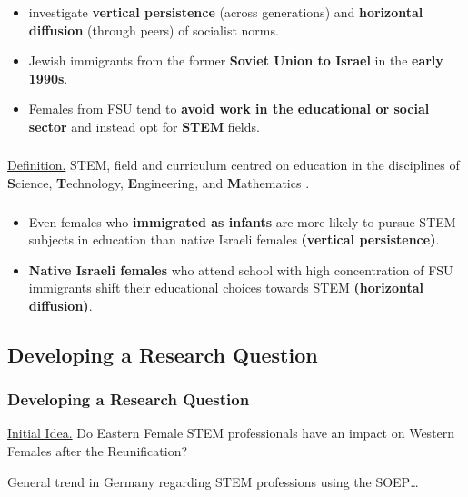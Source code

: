 \documentclass[11pt, aspectratio=1610, xcolor={dvipsnames}]{beamer}
\newcommand{\highlight}[1]{\textbf{\textcolor{PineGreen}{#1}}}
\begin{document}
	\begin{frame}
		\frametitle{}
		
		\begin{itemize}
			\item \cite{FriedmanSokuler2020} investigate \highlight{vertical persistence} (across generations) and \highlight{horizontal diffusion} (through peers) of socialist norms.
			\item Jewish immigrants from the former \highlight{Soviet Union to Israel} in the \highlight{early 1990s}.
			\item Females from FSU tend to \highlight{avoid work in the educational or social sector} and instead opt for \highlight{STEM} fields.
		\end{itemize}
		
	\end{frame}
	
	\begin{frame}
		\frametitle{}
		
		\textcolor{PineGreen}{\underline{Definition.}} STEM, field and curriculum centred on education in the disciplines of \textbf{S}cience, \textbf{T}echnology, \textbf{E}ngineering, and \textbf{M}athematics \textcolor{darkgray}{\citep{Hallinen2024}}.
		
	\end{frame}
	
	\begin{frame}
		\frametitle{}
		
		\begin{itemize}
			\item Even females who \highlight{immigrated as infants} are more likely to pursue STEM subjects in education than native Israeli females \highlight{(vertical persistence)}.
			\item \highlight{Native Israeli females} who attend school with high concentration of FSU immigrants shift their educational choices towards STEM \highlight{(horizontal diffusion)}.
		\end{itemize}
		
	\end{frame}
	
	\subsection{Developing a Research Question}
	\begin{frame}
		\frametitle{Developing a Research Question}
		
		\textcolor{PineGreen}{\underline{Initial Idea.}} Do Eastern Female STEM professionals have an impact on Western Females after the Reunification?
		
		\vspace{1cm}
		
		General trend in Germany regarding STEM professions using the SOEP…
		
	\end{frame}
	
\end{document}
